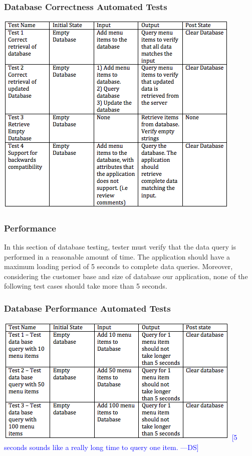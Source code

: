 \documentclass[12pt]{article}
\newcommand{\authornote}[3]{\textcolor{#1}{[#3 ---#2]}}
\newcommand{\authornote}[3]{}
\newcommand{\ds}[1]{\authornote{blue}{DS}{#1}}
\begin{document}
\subsubsection{Database Correctness Automated Tests }
\includegraphics[width=\textwidth,height=\textheight,keepaspectratio]{correctness_tests.png}

\subsubsection{Performance}
In this section of database testing, tester must verify that the data query is performed in a reasonable amount of time. The application should have a maximum loading period of 5 seconds to complete data queries. Moreover, considering the customer base and size of database our application, none of the following test cases should take more than 5 seconds.
\subsubsection{Database Performance Automated Tests }
\includegraphics[width=\textwidth,height=\textheight,keepaspectratio]{performance_tests.png}
\ds{5 seconds sounds like a really long time to query one item.}
\end{document}
